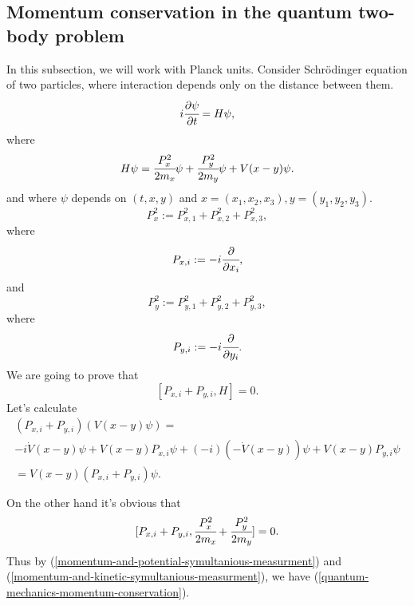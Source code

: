 \documentclass[main.tex]{subfiles}
\begin{document}
\subsection{Momentum conservation in the quantum two-body problem}
\label{QM-momentum-conservation-2body}
In this subsection, we will work with Planck units.
Consider Schrödinger equation of two particles, where interaction depends only on the distance between them. 
\begin{equation}
i\cfrac{\partial \psi}{\partial t} = H\psi,
\end{equation}
where
\begin{equation}
\label{two-body-hamiltonian}
H\psi = \cfrac{P^2_x}{2m_x}\psi + \cfrac{P^2_y}{2m_y}\psi + V(x-y)\psi. 
\end{equation}
and where $\psi$ depends on $(t, x, y)$ and $x=(x_1, x_2, x_3), y=(y_1, y_2, y_3)$.
\begin{equation}
P^2_x := P^2_{x,1} + P^2_{x,2} + P^2_{x,3},
\end{equation} 
where 
\begin{equation}
P_{x,i} := -i\cfrac{\partial}{\partial x_i},
\end{equation}
and
\begin{equation}
P^2_y := P^2_{y,1} + P^2_{y,2} + P^2_{y,3},
\end{equation} 
where 
\begin{equation}
P_{y,i} := -i\cfrac{\partial}{\partial y_i}.
\end{equation}
We are going to prove that
\begin{equation}
\label{quantum-mechanics-momentum-conservation}
[P_{x,i} + P_{y,i}, H] = 0.
\end{equation}
Let's calculate 
\begin{multline}
\label{momentum-and-potential-symultanious-measurment}
(P_{x,i} + P_{y,i})(V(x-y)\psi) = \\
-i\dot{V}(x - y)\psi + V(x - y)P_{x,i}\psi +  
(-i)(-\dot{V}(x - y))\psi + V(x - y)P_{y,i}\psi \\
= V(x - y)(P_{x,i} + P_{y,i})\psi. \\
\\
\end{multline}
On the other hand it's obvious that 
\begin{equation}
\label{momentum-and-kinetic-symultanious-measurment}
[P_{x,i} + P_{y,i}, \cfrac{P^2_x}{2m_x} + \cfrac{P^2_y}{2m_y}] = 0.
\end{equation}
Thus by (\ref{momentum-and-potential-symultanious-measurment}) and (\ref{momentum-and-kinetic-symultanious-measurment}), we have (\ref{quantum-mechanics-momentum-conservation}).
\end{document}
